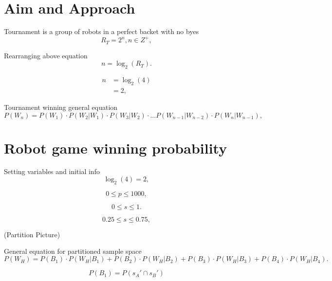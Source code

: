 \documentclass[11pt]{article}
\begin{document}
\section{Aim and Approach}

Tournament is a group of robots in a perfect backet with no byes
\begin{equation*}
    R_T = 2^n, n \in Z^+,
\end{equation*}

Rearranging above equation
\begin{equation*}
    n = \log_2(R_T).
\end{equation*}

\begin{align*}
    n &= \log_2(4)\\
    &= 2,
\end{align*}

Tournament winning general equation
\begin{equation*}
    P(W_n) = P(W_1) \cdot P(W_2 | W_1) \cdot P(W_3 | W_2) \cdot \dots P(W_{n-1} | W_{n-2}) \cdot P(W_n | W_{n-1}),
\end{equation*}

\section{Robot game winning probability}
Setting variables and initial info
\begin{equation*}
    \log_2(4) = 2,
\end{equation*}

\begin{equation*}
    0 \leq p \leq 1000,
\end{equation*}

\begin{equation*}
    0 \leq s \leq 1.
\end{equation*}

\begin{equation*}
    0.25 \leq s \leq 0.75,
\end{equation*}

(Partition Picture)

General equation for partitioned sample space
\begin{equation*}
    P(W_H) = P(B_1) \cdot P(W_H | B_1) + P(B_2) \cdot P(W_H | B_2) + P(B_3) \cdot P(W_H | B_3) + P(B_4) \cdot P(W_H | B_4).
\end{equation*}

\begin{equation*}
    P(B_1) = P(s_A' \cap s_B')
\end{equation*}
\end{document}
